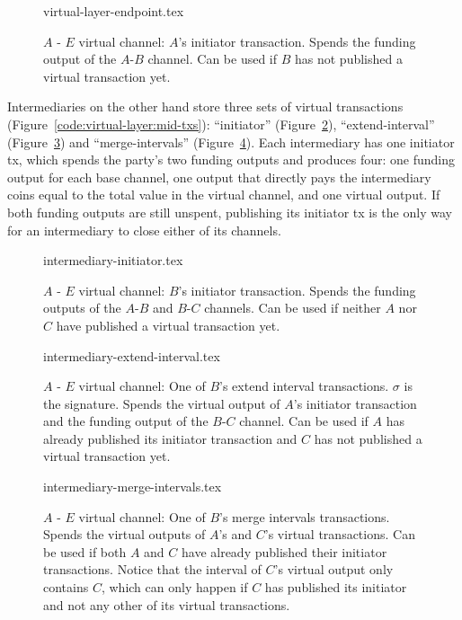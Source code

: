  \begin{figure}
    {virtual-layer-endpoint.tex}
    \caption{$A$ - $E$ virtual channel: $A$'s initiator transaction. Spends the
    funding output of the $A$-$B$ channel. Can be used if $B$ has not published
    a virtual transaction yet.}
    \label{figure:virtual-layer-endpoint}
  \end{figure}

  Intermediaries on the other hand store three sets of virtual transactions
  (Figure~\ref{code:virtual-layer:mid-txs}): ``initiator''
  (Figure~\ref{figure:virtual-layer-initiator}), ``extend-interval''
  (Figure~\ref{figure:virtual-layer-extend-interval}) and ``merge-intervals''
  (Figure~\ref{figure:virtual-layer-merge-intervals}). Each intermediary has one
  initiator tx, which spends the party's two funding outputs and produces four:
  one funding output for each base channel, one output that directly pays the
  intermediary coins equal to the total value in the virtual channel, and one
  virtual output. If both funding outputs are still unspent, publishing its
  initiator tx is the only way for an intermediary to close either of its
  channels.

  \begin{figure}
    {intermediary-initiator.tex}
    \caption{$A$ - $E$ virtual channel: $B$'s initiator transaction. Spends the
    funding outputs of the $A$-$B$ and $B$-$C$ channels. Can be used if neither
    $A$ nor $C$ have published a virtual transaction yet.}
    \label{figure:virtual-layer-initiator}
  \end{figure}

  \begin{figure}
    {intermediary-extend-interval.tex}
    \caption{$A$ - $E$ virtual channel: One of $B$'s extend interval
    transactions. $\sigma$ is the signature. Spends the virtual output of $A$'s
    initiator transaction and the funding output of the $B$-$C$ channel. Can be
    used if $A$ has already published its initiator transaction and $C$ has not
    published a virtual transaction yet.}
    \label{figure:virtual-layer-extend-interval}
  \end{figure}

  \begin{figure}
    {intermediary-merge-intervals.tex}
    \caption{$A$ - $E$ virtual channel: One of $B$'s merge intervals
    transactions. Spends the virtual outputs of $A$'s and $C$'s virtual
    transactions. Can be used if both $A$ and $C$ have already published their
    initiator transactions. Notice that the interval of $C$'s virtual output
    only contains $C$, which can only happen if $C$ has published its initiator
    and not any other of its virtual transactions.}
    \label{figure:virtual-layer-merge-intervals}
  \end{figure}


